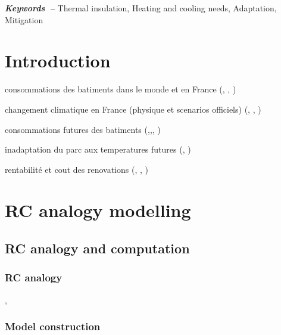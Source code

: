 \documentclass[11pt]{article}
\providecommand{\keywords}[1]
{
  \small    
  \textbf{\textit{Keywords~--}} #1
}
\begin{document}
\keywords{Thermal insulation, Heating and cooling needs, Adaptation, Mitigation}

\clearpage
\tableofcontents

\clearpage

\section{Introduction}
\label{sec:intro}

consommations des batiments dans le monde et en France (\cite{unep_2023_2024}, \cite{sdes_chiffres_2023}, \cite{sdes_consommation_2023})

changement climatique en France (physique et scenarios officiels) (\cite{ipcc_climate_2021}, \cite{ouzeau_heat_2016}, \cite{ministere_de_la_transition_ecologique_trajectoire_2023})

consommations futures des batiments (\cite{larsen_climate_2020},\cite{moreau_evaluation_2023},\cite{filahi_projections_2024}, \cite{tao_uncertainty_2024})

inadaptation du parc aux temperatures futures (\cite{cour_des_comptes_laction_2024}, \cite{i4ce_vagues_2024})

rentabilité et cout des renovations (\cite{ademe_renovation_2019}, \cite{i4ce_trajectoires_2023}, \cite{giraudet_analyse_2024})


\section{RC analogy modelling}
\label{sec:rc}

    \subsection{RC analogy and computation} %
    \label{sub:rc_analogy_and_computation}

        \subsubsection{RC analogy} %
        \label{ssub:rc_analogy}


        \cite{fourier_theorie_1822}, \cite{bolmont_evolution_2003}
        

        \subsubsection{Model construction} %
        \label{ssub:model_construction}
\end{document}
